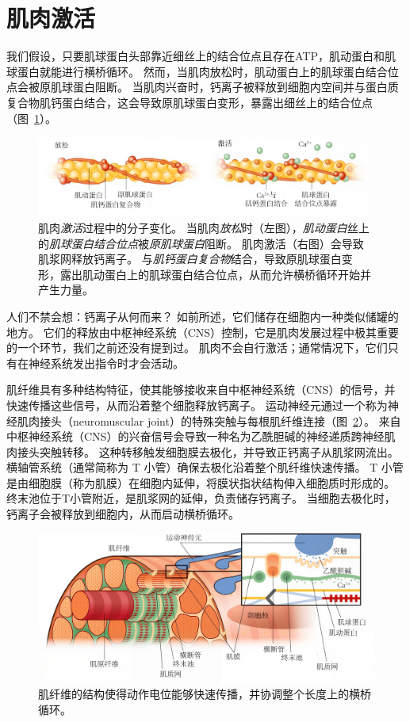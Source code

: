 \section{肌肉激活}

我们假设，只要肌球蛋白头部靠近细丝上的结合位点且存在ATP，肌动蛋白和肌球蛋白就能进行横桥循环。
然而，当肌肉放松时，肌动蛋白上的肌球蛋白结合位点会被原肌球蛋白阻断。
当肌肉兴奋时，钙离子被释放到细胞内空间并与蛋白质复合物肌钙蛋白结合，这会导致原肌球蛋白变形，暴露出细丝上的结合位点（图~\ref{fig:4_10}）。


\begin{figure}[!htb]
	\centering
	\includegraphics[width=0.85\linewidth]{chap4/4_10}
	\caption{肌肉\textit{激活}过程中的分子变化。
		当肌肉\textit{放松}时（左图），\textit{肌动蛋白}丝上的\textit{肌球蛋白结合位点}被\textit{原肌球蛋白}阻断。
		肌肉激活（右图）会导致肌浆网释放钙离子。
		与\textit{肌钙蛋白复合物}结合，导致原肌球蛋白变形，露出肌动蛋白上的肌球蛋白结合位点，从而允许横桥循环开始并产生力量。 \label{fig:4_10}}
\end{figure}

人们不禁会想：钙离子从何而来？
如前所述，它们储存在细胞内一种类似储罐的地方。
它们的释放由中枢神经系统（CNS）控制，它是肌肉发展过程中极其重要的一个环节，我们之前还没有提到过。
肌肉不会自行激活；通常情况下，它们只有在神经系统发出指令时才会活动。


肌纤维具有多种结构特征，使其能够接收来自中枢神经系统（CNS）的信号，并快速传播这些信号，从而沿着整个细胞释放钙离子。
运动神经元通过一个称为神经肌肉接头（neuromuscular joint）的特殊突触与每根肌纤维连接（图~\ref{fig:4_11}）。
来自中枢神经系统（CNS）的兴奋信号会导致一种名为乙酰胆碱的神经递质跨神经肌肉接头突触转移。
这种转移触发细胞膜去极化，并导致正钙离子从肌浆网流出。
横轴管系统（通常简称为 T 小管）确保去极化沿着整个肌纤维快速传播。
T 小管是由细胞膜（称为肌膜）在细胞内延伸，将膜状指状结构伸入细胞质时形成的。
终末池位于T小管附近，是肌浆网的延伸，负责储存钙离子。
当细胞去极化时，钙离子会被释放到细胞内，从而启动横桥循环。


\begin{figure}[!htb]
	\centering
	\includegraphics[width=0.95\linewidth]{chap4/4_11}
	\caption{肌纤维的结构使得动作电位能够快速传播，并协调整个长度上的横桥循环。 \label{fig:4_11}}
\end{figure}


